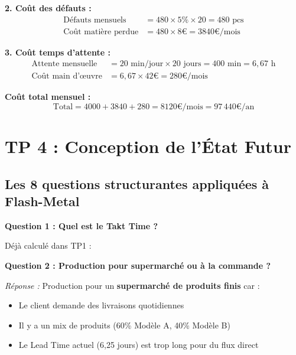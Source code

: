 \documentclass[12pt,a4paper]{article}
\begin{document}
\textbf{2. Coût des défauts :}
\begin{align*}
    \text{Défauts mensuels} &= 480 \times 5\% \times 20 = 480 \text{ pcs} \\
    \text{Coût matière perdue} &= 480 \times 8\text{€} = \boxed{3840\text{€/mois}}
\end{align*}

\textbf{3. Coût temps d'attente :}
\begin{align*}
    \text{Attente mensuelle} &= 20 \text{ min/jour} \times 20 \text{ jours} = 400 \text{ min} = 6{,}67 \text{ h} \\
    \text{Coût main d'œuvre} &= 6{,}67 \times 42\text{€} = \boxed{280\text{€/mois}}
\end{align*}

\textbf{Coût total mensuel :}
\begin{equation*}
    \boxed{\text{Total} = 4000 + 3840 + 280 = 8120\text{€/mois} = 97\,440\text{€/an}}
\end{equation*}

\newpage

\section{TP 4 : Conception de l'État Futur}

\subsection{Les 8 questions structurantes appliquées à Flash-Metal}

\textbf{Question 1 : Quel est le Takt Time ?}

Déjà calculé dans TP1 : 

\medskip

\textbf{Question 2 : Production pour supermarché ou à la commande ?}

\textit{Réponse :} Production pour un \textbf{supermarché de produits finis} car :
\begin{itemize}
    \item Le client demande des livraisons quotidiennes
    \item Il y a un mix de produits (60\% Modèle A, 40\% Modèle B)
    \item Le Lead Time actuel (6,25 jours) est trop long pour du flux direct
\end{itemize}

\medskip
\end{document}
